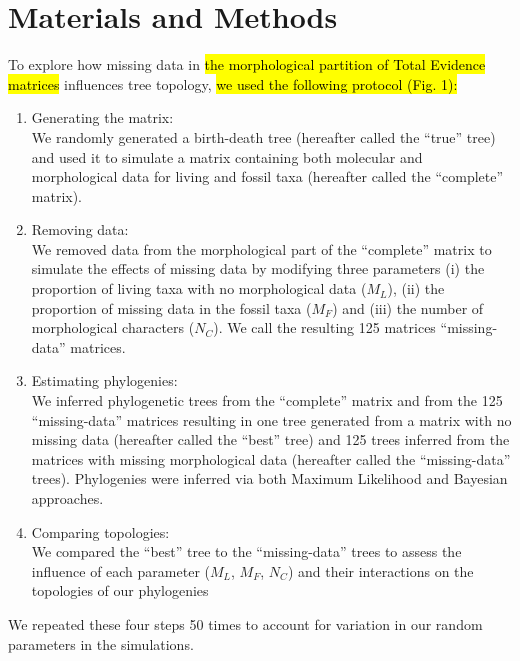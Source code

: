 \documentclass[12pt,letterpaper]{article}
\begin{document}
\section{Materials and Methods}
To explore how missing data in \hl{the morphological partition of Total Evidence matrices} influences tree topology, \hl{we used the following protocol (Fig. 1):}
\begin{enumerate}
\item{Generating the matrix:} \label{step:generate_matrix} \\
We randomly generated a birth-death tree (hereafter called the ``true'' tree) and used it to simulate a matrix containing both molecular and morphological data for living and fossil taxa (hereafter called the ``complete'' matrix).
\item{Removing data:} \label{step:remove_data} \\
We removed data from the morphological part of the ``complete'' matrix to simulate the effects of missing data by modifying three parameters (i) the proportion of living taxa with no morphological data ($M_{L}$), (ii) the proportion of missing data in the fossil taxa ($M_{F}$) and (iii) the number of morphological characters ($N_{C}$). We call the resulting 125 matrices ``missing-data'' matrices.
\item{Estimating phylogenies:} \label{step:build_phylo} \\
We inferred phylogenetic trees from the ``complete'' matrix and from the 125 ``missing-data'' matrices resulting in one tree generated from a matrix with no missing data (hereafter called the ``best'' tree) and 125 trees inferred from the matrices with missing morphological data (hereafter called the ``missing-data'' trees). Phylogenies were inferred via both Maximum Likelihood and Bayesian approaches.
\item{Comparing topologies:} \label{step:compare_topo} \\
We compared the ``best'' tree to the ``missing-data'' trees to assess the influence of each parameter ($M_{L}$, $M_{F}$, $N_{C}$) and their interactions on the topologies of our phylogenies
\end{enumerate}
We repeated these four steps 50 times to account for variation in our random parameters in the simulations.

\end{document}
